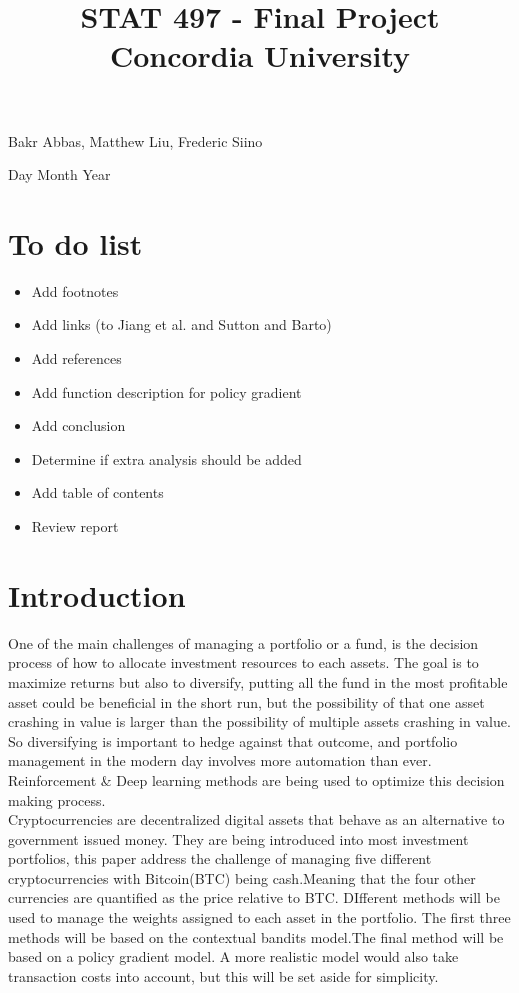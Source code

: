 \documentclass[a4paper,12pt]{article}
\title{
{STAT 497 - Final Project} \\
{\large Concordia University} \\
}
\date{}
\begin{document}
\begin{titlingpage}
  \maketitle
  \centering
  \vfill
  {\large{Bakr Abbas, Matthew Liu, Frederic Siino}} \par
  {\large{Day Month Year}}
\end{titlingpage}

\newpage

\section{To do list}

\begin{itemize}
  \item Add footnotes
  \item Add links (to Jiang et al. and Sutton and Barto)
  \item Add references
  \item Add function description for policy gradient
  \item Add conclusion
  \item Determine if extra analysis should be added
  \item Add table of contents
  \item Review report
\end{itemize}

\newpage

\section{Introduction}
One of the main challenges of managing a portfolio or a fund, is the decision process of how to allocate investment resources to each assets. The goal is to maximize returns but also to diversify, putting all the fund in the most profitable asset could be beneficial in the short run, but the possibility of that one asset crashing in value is larger than the possibility of multiple assets crashing in value. So diversifying is important to hedge against that outcome, and portfolio management in the modern day involves more automation than ever. Reinforcement \& Deep learning methods are being used to optimize this decision making process. \\

Cryptocurrencies are decentralized digital assets that behave as an alternative to government issued money. They are being introduced into most investment portfolios, this paper address the challenge of managing five different cryptocurrencies with Bitcoin(BTC) being cash.Meaning that the four other currencies are quantified as the price relative to BTC.  DIfferent methods will be used to manage the weights assigned to each asset in the portfolio. The first three methods will be based on the contextual bandits model.The final method will be based on a policy gradient model. A more realistic model would also take transaction costs into account, but this will be set aside for simplicity. \\
\end{document}
